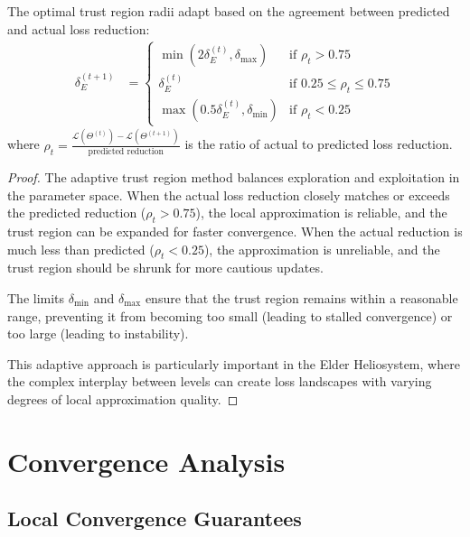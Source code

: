 \begin{theorem}
The optimal trust region radii adapt based on the agreement between predicted and actual loss reduction:
\begin{align}
\delta_E^{(t+1)} &= 
\begin{cases}
\min(2\delta_E^{(t)}, \delta_{\text{max}}) & \text{if } \rho_t > 0.75 \\
\delta_E^{(t)} & \text{if } 0.25 \leq \rho_t \leq 0.75 \\
\max(0.5\delta_E^{(t)}, \delta_{\text{min}}) & \text{if } \rho_t < 0.25
\end{cases}
\end{align}
where $\rho_t = \frac{\mathcal{L}(\Theta^{(t)}) - \mathcal{L}(\Theta^{(t+1)})}{\text{predicted reduction}}$ is the ratio of actual to predicted loss reduction.
\end{theorem}

\begin{proof}
The adaptive trust region method balances exploration and exploitation in the parameter space. When the actual loss reduction closely matches or exceeds the predicted reduction ($\rho_t > 0.75$), the local approximation is reliable, and the trust region can be expanded for faster convergence. When the actual reduction is much less than predicted ($\rho_t < 0.25$), the approximation is unreliable, and the trust region should be shrunk for more cautious updates.

The limits $\delta_{\text{min}}$ and $\delta_{\text{max}}$ ensure that the trust region remains within a reasonable range, preventing it from becoming too small (leading to stalled convergence) or too large (leading to instability).

This adaptive approach is particularly important in the Elder Heliosystem, where the complex interplay between levels can create loss landscapes with varying degrees of local approximation quality.
\end{proof}

\section{Convergence Analysis}

\subsection{Local Convergence Guarantees}


